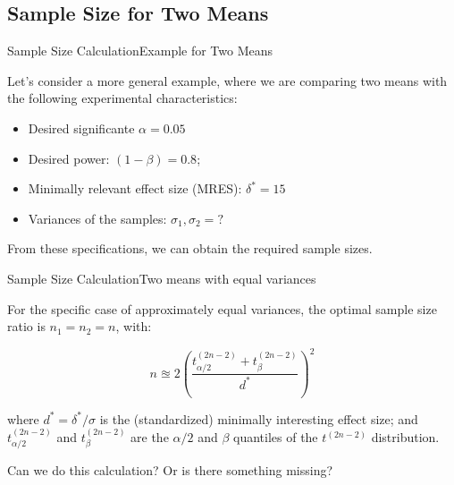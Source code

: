 \subsection{Sample Size for Two Means}

\begin{frame}{Sample Size Calculation}{Example for Two Means}

Let's consider a more general example, where we are comparing two means with the following experimental characteristics:\bigskip

\begin{itemize}
  \item Desired significante $\alpha = 0.05$
  \item Desired power: $(1-\beta) = 0.8$;
  \item Minimally relevant effect size (MRES): $\delta^* = 15$
  \item Variances of the samples: $\sigma_1, \sigma_2 = ?$
\end{itemize}\bigskip

From these specifications, we can obtain the required sample sizes.
\end{frame}

\begin{frame}{Sample Size Calculation}{Two means with equal variances}

For the specific case of approximately equal variances, the optimal sample size ratio is $n_1 = n_2 = n$, with:

\begin{equation*}
n \approxeq 2\left(\frac{t^{(2n-2)}_{\alpha/2}+t^{(2n-2)}_{\beta}}{d^*}\right)^2
\end{equation*}

where $d^* = \delta^*/\sigma$ is the (standardized) minimally interesting effect size; and $t^{(2n-2)}_{\alpha/2}$ and $t^{(2n-2)}_{\beta}$ are the $\alpha/2$ and $\beta$ quantiles of the $t^{(2n-2 )}$ distribution.\bigskip

Can we do this calculation? Or is there something missing?

\end{frame}

